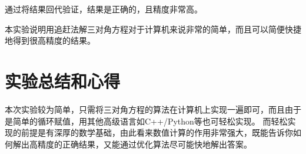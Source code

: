 \documentclass[reportComp]{thesis}
\begin{document}
通过将结果回代验证，结果是正确的，且精度非常高。

本实验说明用追赶法解三对角方程对于计算机来说非常的简单，而且可以简便快捷地得到很高精度的结果。

\section{实验总结和心得}
本次实验较为简单，只需将三对角方程的算法在计算机上实现一遍即可，而且由于是简单的循环赋值，用其他高级语言如C++/Python等也可轻松实现。
而轻松实现的前提是有深厚的数学基础，由此看来数值计算的作用非常强大，既能告诉你如何解出高精度的正确结果，又能通过优化算法尽可能快地解出答案。
\end{document}
